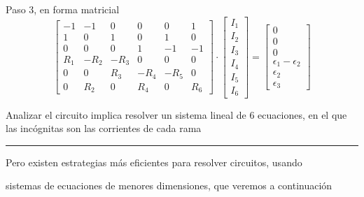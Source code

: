 \documentclass[aspectratio=169, xcolor={usenames,svgnames,dvipsnames}]{beamer}
\begin{document}
\begin{frame}{Paso 3, \hspace{3mm}en forma matricial}
    \vspace{4mm}
    \begin{equation*}
      \begin{bmatrix}
        -1 & -1 & 0 & 0 & 0 & 1\\
        1 & 0 & 1 & 0 & 1 & 0\\
        0 & 0 & 0 & 1 & -1 & -1\\
        R_1 & -R_2 & - R_3 & 0 & 0 & 0\\
        0 & 0 & R_3 & - R_4 & - R_5 & 0\\
        0 & R_2 & 0 & R_4 & 0 & R_6
      \end{bmatrix} \cdot %
      \begin{bmatrix}
        I_1\\
        I_2\\
        I_3\\
        I_4\\
        I_5\\
        I_6    
      \end{bmatrix} = %
      \begin{bmatrix}
        0\\
        0\\
        0\\
        \epsilon_1 - \epsilon_2\\
        \epsilon_2\\
        \epsilon_3
      \end{bmatrix}
    \end{equation*}

    \vspace{2mm}
    \begin{center}
        \begin{minipage}{0.8\linewidth} 
            \begin{center}
                Analizar el circuito implica resolver un sistema lineal de \alert{6 ecuaciones}, en el que las incógnitas son las corrientes de cada rama
            \end{center} 
        \end{minipage}
        
        \vspace{2mm}
    
        \noindent\rule{\textwidth}{0.5pt}
    
        \vspace{4mm}

        \begin{minipage}{0.8\linewidth} 
            \begin{center}
                \small{Pero existen estrategias más eficientes para resolver circuitos, usando 
                
                sistemas de ecuaciones de menores dimensiones, que veremos a continuación}
            \end{center} 
        \end{minipage}
    \end{center}    
\end{frame}
\end{document}
